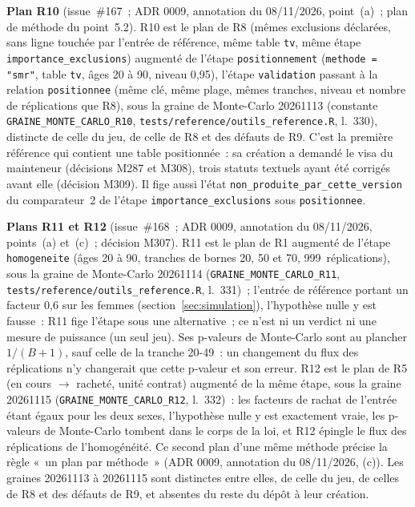 \documentclass[a4paper,11pt]{article}
\newcommand{\code}[1]{\texttt{\small #1}}
\begin{document}
\medskip
\noindent
\textbf{Plan R10} (issue~\#167~; ADR 0009, annotation du 08/11/2026,
point~(a)~; plan de méthode du point~5.2). R10 est le plan de R8 (mêmes
exclusions déclarées, sans ligne touchée par l'entrée de référence, même
table \code{tv}, même étape \code{importance\_exclusions}) augmenté de
l'étape \code{positionnement} (\code{methode = "smr"}, table \code{tv},
âges 20 à 90, niveau 0,95), l'étape \code{validation} passant à la
relation \code{positionnee} (même clé, même plage, mêmes tranches, niveau
et nombre de réplications que R8), sous la graine de Monte-Carlo
20261113 (constante \code{GRAINE\_MONTE\_CARLO\_R10},
\code{tests/reference/outils\_reference.R}, l.~330), distincte de celle du
jeu, de celle de R8 et des défauts de R9. C'est la première référence qui
contient une table positionnée~: sa création a demandé le visa du
mainteneur (décisions M287 et M308), trois statuts textuels ayant été
corrigés avant elle (décision M309). Il fige aussi l'état
\code{non\_produite\_par\_cette\_version} du comparateur~2 de l'étape
\code{importance\_exclusions} sous \code{positionnee}.

\medskip
\noindent
\textbf{Plans R11 et R12} (issue~\#168~; ADR 0009, annotation du
08/11/2026, points~(a) et~(c)~; décision M307). R11 est le plan de R1
augmenté de l'étape \code{homogeneite} (âges 20 à 90, tranches de bornes
20, 50 et 70, 999~réplications), sous la graine de Monte-Carlo 20261114
(\code{GRAINE\_MONTE\_CARLO\_R11}, \code{tests/reference/outils\_reference.R},
l.~331)~; l'entrée de référence portant un facteur 0,6 sur les femmes
(section~\ref{sec:simulation}), l'hypothèse nulle y est fausse~: R11 fige
l'étape sous une alternative~; ce n'est ni un verdict ni une mesure de
puissance (un seul jeu). Ses p-valeurs de Monte-Carlo sont au plancher
$1/(B + 1)$, sauf celle de la tranche 20-49~: un changement du flux des
réplications n'y changerait que cette p-valeur et son erreur. R12 est le plan de R5 (en cours $\to$
racheté, unité contrat) augmenté de la même étape, sous la graine 20261115
(\code{GRAINE\_MONTE\_CARLO\_R12}, l.~332)~: les facteurs de rachat de
l'entrée étant égaux pour les deux sexes, l'hypothèse nulle y est
exactement vraie, les p-valeurs de Monte-Carlo tombent dans le corps de la
loi, et R12 épingle le flux des réplications de l'homogénéité. Ce second
plan d'une même méthode précise la règle «~un plan par méthode~» (ADR 0009,
annotation du 08/11/2026, (c)). Les graines 20261113 à 20261115 sont
distinctes entre elles, de celle du jeu, de celles de R8 et des défauts de
R9, et absentes du reste du dépôt à leur création.
\end{document}
